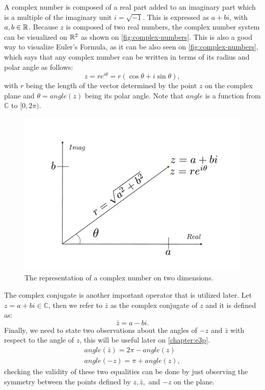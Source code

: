 A complex number is composed of a real part added to an imaginary part which is a multiple of the imaginary unit $i = \sqrt{-1}$. This is expressed as $a + bi$, with $a, b \in \mathbb{R}$. Because $z$ is composed of two real numbers, the complex number system can be visualized on $\mathbb{R}^2$ as shown on \autoref{fig:complex-numbers}. This is also a good way to visualize Euler's Formula, as it can be also seen on \autoref{fig:complex-numbers}, which says that any complex number can be written in terms of its radius and polar angle as follows:
\begin{equation}
z = re^{i\theta}=r(\cos{\theta} + i\sin{\theta}),
\end{equation}
with $r$ being the length of the vector determined by the point $z$ on the complex plane and $\theta = angle(z)$ being its polar angle. Note that $angle$ is a function from $\mathbb{C}$ to $[0, 2\pi)$.
\begin{figure}[ht]
	\centering
	\def\svgwidth{\columnwidth}
	\includegraphics[scale=.4]{tex/figures/complex_numbers}
	\caption{The representation of a complex number on two dimensions.}
	\label{fig:complex-numbers}
\end{figure}

The complex conjugate is another important operator that is utilized later. Let $z = a + bi \in \mathbb{C}$, then we refer to $\bar{z}$ as the complex conjugate of $z$ and it is defined as:
\begin{equation}
\bar{z} = a - bi.
\end{equation}
Finally, we need to state two observations about the angles of $-z$ and $\bar{z}$ with respect to the angle of $z$, this will be useful later on \autoref{chapter:e3p}.
\begin{align}
angle(\bar{z}) = 2\pi-angle(z)\\
angle(-z) = \pi + angle(z),
\end{align}
checking the validity of these two equalities can be done by just observing the symmetry between the points defined by $z, \bar{z},$ and $-z$ on the plane.



